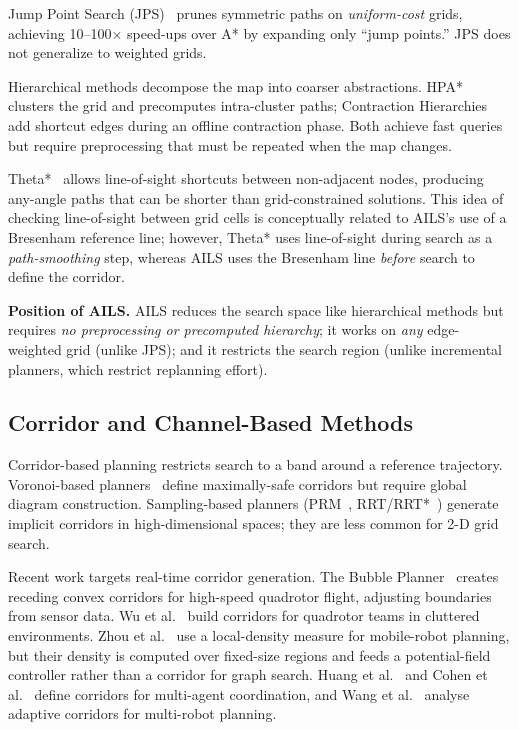 \documentclass[journal]{IEEEtran}
\begin{document}
Jump Point Search (JPS)~\cite{harabor2011online} prunes symmetric paths on \emph{uniform-cost} grids, achieving 10--100$\times$ speed-ups over A* by expanding only ``jump points.''
JPS does not generalize to weighted grids.

Hierarchical methods decompose the map into coarser abstractions.
HPA*~\cite{botea2004near} clusters the grid and precomputes intra-cluster paths; Contraction Hierarchies~\cite{geisberger2008contraction} add shortcut edges during an offline contraction phase.
Both achieve fast queries but require preprocessing that must be repeated when the map changes.

Theta*~\cite{nash2007theta} allows line-of-sight shortcuts between non-adjacent nodes, producing any-angle paths that can be shorter than grid-constrained solutions.
This idea of checking line-of-sight between grid cells is conceptually related to AILS's use of a Bresenham reference line; however, Theta* uses line-of-sight during search as a \emph{path-smoothing} step, whereas AILS uses the Bresenham line \emph{before} search to define the corridor.

\textbf{Position of AILS.}
AILS reduces the search space like hierarchical methods but requires \emph{no preprocessing or precomputed hierarchy}; it works on \emph{any} edge-weighted grid (unlike JPS); and it restricts the search region (unlike incremental planners, which restrict replanning effort).

\subsection{Corridor and Channel-Based Methods}

Corridor-based planning restricts search to a band around a reference trajectory.
Voronoi-based planners~\cite{aurenhammer1991voronoi} define maximally-safe corridors but require global diagram construction.
Sampling-based planners (PRM~\cite{kavraki1996probabilistic}, RRT/RRT*~\cite{lavalle1998rapidly,karaman2011sampling}) generate implicit corridors in high-dimensional spaces; they are less common for 2-D grid search.

Recent work targets real-time corridor generation.
The Bubble Planner~\cite{chen2024bubble} creates receding convex corridors for high-speed quadrotor flight, adjusting boundaries from sensor data.
Wu et al.~\cite{wu2023corridor} build corridors for quadrotor teams in cluttered environments.
Zhou et al.~\cite{zhou2024local} use a local-density measure for mobile-robot planning, but their density is computed over fixed-size regions and feeds a potential-field controller rather than a corridor for graph search.
Huang et al.~\cite{huang2024corridor} and Cohen et al.~\cite{cohen2023corridor} define corridors for multi-agent coordination, and Wang et al.~\cite{wang2025adaptive} analyse adaptive corridors for multi-robot planning.
\end{document}
